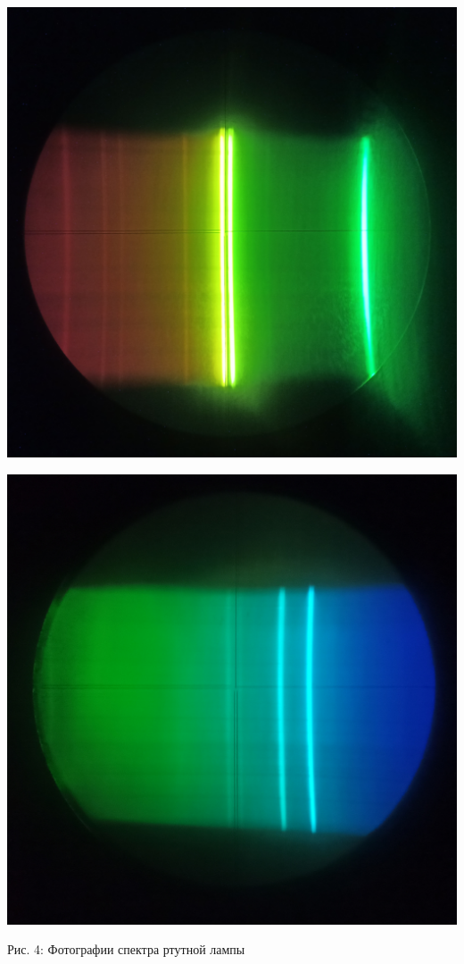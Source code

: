 \documentclass[12pt]{article}
\begin{document}
    \begin{minipage}[b]{\linewidth}
        \centering
        \begin{minipage}[b]{0.3\linewidth}
            \includegraphics[width=\linewidth]{pic/1}
        \end{minipage}
        \begin{minipage}[b]{0.3\linewidth}
            \includegraphics[width=\linewidth]{pic/2}
        \end{minipage}

        \caption{Рис. 4: Фотографии спектра ртутной лампы}
    \end{minipage}
\end{document}
